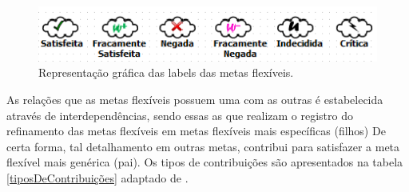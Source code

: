 \begin{figure}[h]
	\centering
	\includegraphics[keepaspectratio=true,scale=0.9]{figuras/labelsSoftgoals.png}
	\caption{Representação gráfica das labels das metas flexíveis.}
	\label{fig02}
\end{figure} 

As relações que as metas flexíveis possuem uma com as outras é estabelecida através de interdependências, sendo essas as que realizam o registro do refinamento das metas flexíveis em metas flexíveis mais específicas (filhos) De certa forma, tal detalhamento em outras metas, contribui para satisfazer a meta flexível mais genérica (pai). Os tipos de contribuições são apresentados na tabela \ref{tiposDeContribuições} adaptado de  \cite{chung2012non}.

